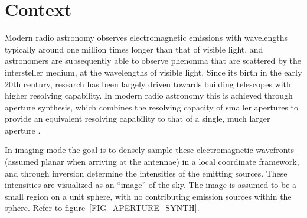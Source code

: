 \documentclass[a4paper, two column]{article}
\begin{document}
\saythanks
\section{Context}
Modern radio astronomy observes electromagnetic emissions with wavelengths typically around one million times longer than that of visible light, and astronomers are subsequently 
able to observe phenonma that are scattered by the intersteller medium, at the wavelengths of visible light. Since its birth in the early 20th century, research has been largely 
driven towards building telescopes with higher resolving capability. In modern radio astronomy this is achieved through aperture synthesis, which combines the resolving capacity 
of smaller apertures to provide an equivalent resolving capability to that of a single, much larger aperture \cite{christiansenradiotelescopes}.

In imaging mode the goal is to densely sample these electromagnetic wavefronts (assumed planar when arriving at the antennae) in a local coordinate framework, and through inversion 
determine the intensities of the emitting sources. These intensities are visualized as an ``image'' of the sky. The image is assumed to be a small region on a unit sphere, with no 
contributing emission sources within the sphere. Refer to figure~\ref{FIG_APERTURE_SYNTH}.
\end{document}
